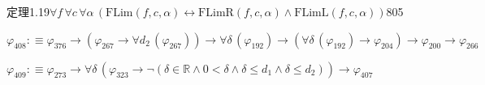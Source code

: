 \begin{fullproof}{定理1.19}{$\forall f\,\forall c\,\forall \alpha\,(\mathrm{FLim}(f,c,\alpha) \leftrightarrow \mathrm{FLimR}(f,c,\alpha) \land \mathrm{FLimL}(f,c,\alpha))$}{805}
\begin{abbrevlist}
\item $\varphi_{408} :\equiv \varphi_{376} \to (\varphi_{267} \to \forall d_{2}\,(\varphi_{267})) \to \forall \delta\,(\varphi_{192}) \to (\forall \delta\,(\varphi_{192}) \to \varphi_{204}) \to \varphi_{200} \to \varphi_{266}$
\item $\varphi_{409} :\equiv \varphi_{273} \to \forall \delta\,(\varphi_{323} \to \neg (\delta \in \mathbb{R} \land 0 < \delta \land \delta \leq d_{1} \land \delta \leq d_{2})) \to \varphi_{407}$
\end{abbrevlist}
\end{fullproof}
